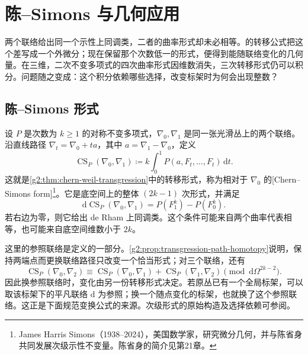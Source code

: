 
% 
% 
% 

\section{陈–Simons 与几何应用}
\label{g2:sec:2204}

两个联络给出同一个示性上同调类，二者的曲率形式却未必相等。的转移公式把这个差写成一个外微分；现在保留那个次数低一的形式，便得到能随联络变化的几何量。在三维，二次不变多项式的四次曲率形式因维数消失，三次转移形式仍可以积分。问题随之变成：这个积分依赖哪些选择，改变标架时为何会出现整数？

\subsection{陈–Simons 形式}
\label{g2:subsec:2204:01}
设 \(P\) 是次数为 \(k\ge1\) 的对称不变多项式，\(\nabla_0,\nabla_1\) 是同一张光滑丛上的两个联络。沿直线路径 \(\nabla_t=\nabla_0+t a\)，其中 \(a=\nabla_1-\nabla_0\)，定义
\begin{equation}\label{g2:eq:relative-chern-simons-form}
	\operatorname{CS}_P(\nabla_0,\nabla_1)
	\coloneqq k\int_0^1P(a,F_t,\ldots,F_t)\,\mathrm dt.
\end{equation}
这就是\cref{g2:thm:chern-weil-transgression}中的转移形式，称为相对于 \(\nabla_0\) 的[Chern--Simons form]\footnote{James Harris Simons（1938--2024），美国数学家，研究微分几何，并与陈省身共同发展次级示性不变量。陈省身的简介见第21章。}。它是底空间上的整体 \((2k-1)\) 次形式，并满足
\[
	\mathrm d\operatorname{CS}_P(\nabla_0,\nabla_1)=P(F_1^k)-P(F_0^k).
\]
若右边为零，则它给出 de Rham 上同调类。这个条件可能来自两个曲率代表相等，也可能来自底空间维数小于 \(2k\)。

\ProseParagraphBreak

这里的参照联络是定义的一部分。\cref{g2:prop:transgression-path-homotopy}说明，保持两端点而更换联络路径只改变一个恰当形式；对三个联络，还有
\begin{equation}\label{g2:eq:chern-simons-reference-change}
	\operatorname{CS}_P(\nabla_0,\nabla_2)
	\equiv\operatorname{CS}_P(\nabla_0,\nabla_1)+\operatorname{CS}_P(\nabla_1,\nabla_2)
	\pmod{\mathrm d\Omega^{2k-2}}.
\end{equation}
因此换参照联络时，变化由另一份转移形式决定。若原丛已有一个全局标架，可以取该标架下的平凡联络 \(\mathrm d\) 为参照；换一个随点变化的标架，也就换了这个参照联络。这正是下面规范变换公式的来源。次级形式的原始构造及选择依赖可参阅\cite[第3节]{ChernSimons1974}。

